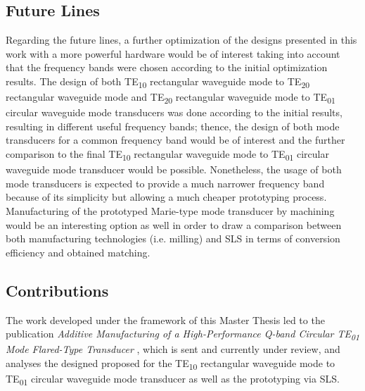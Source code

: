 \documentclass[english,twoside]{article}
\begin{document}
		\subsection{Future Lines}
		Regarding the future lines, a further optimization of the designs presented in this work with a more powerful hardware would be of interest taking into account that the frequency bands were chosen according to the initial optimization results. The design of both \ac{TE}\textsubscript{10} rectangular waveguide mode to \ac{TE}\textsubscript{20} rectangular waveguide mode and \ac{TE}\textsubscript{20} rectangular waveguide mode to \ac{TE}\textsubscript{01} circular waveguide mode transducers was done according to the initial results, resulting in different useful frequency bands; thence, the design of both mode transducers for a common frequency band would be of interest and the further comparison to the final \ac{TE}\textsubscript{10} rectangular waveguide mode to \ac{TE}\textsubscript{01} circular waveguide mode transducer would be possible. Nonetheless, the usage of both mode transducers is expected to provide a much narrower frequency band because of its simplicity but allowing a much cheaper prototyping process.\\

		Manufacturing of the prototyped Marie-type mode transducer by machining would be an interesting option as well in order to draw a comparison between both manufacturing technologies (i.e. milling) and \ac{SLS} in terms of conversion efficiency and obtained matching.
		
		\subsection{Contributions}
		The work developed under the framework of this Master Thesis led to the publication \textit{Additive Manufacturing of a High-Performance Q-band Circular TE\textsubscript{01} Mode Flared-Type Transducer} \cite{gonzalez}, which is sent and currently under review, and analyses the designed proposed for the TE\textsubscript{10} rectangular waveguide mode to TE\textsubscript{01} circular waveguide mode transducer as well as the prototyping via \ac{SLS}.
		
\end{document}
